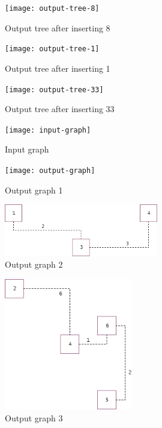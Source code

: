 \documentclass {article}
\begin{document}
\begin{figure}[H]
\centering
\texttt{[image: output-tree-8]}

\caption{Output tree after inserting 8}
\label{fig:output-tree-8}
\end{figure}

\begin{figure}[H]
\texttt{[image: output-tree-1]}

\caption{Output tree after inserting 1}
\label{fig:output-tree-1}
\end{figure}

\begin{figure}[H]
\texttt{[image: output-tree-33]}

\caption{Output tree after inserting 33}
\label{fig:output-tree-33}
\end{figure}

\begin{figure}[H]
\centering
\texttt{[image: input-graph]}

\caption{Input graph}
\label{fig:input-graph}
\end{figure}

\begin{figure}[H]
\centering
\texttt{[image: output-graph]}

\caption{Output graph 1}
\label{fig:output-graph}
\end{figure}

\begin{figure}[H]
\centering
\includegraphics[width=0.6\textwidth]{output-graph2}

\caption{Output graph 2}
\label{fig:output-graph2}
\end{figure}

\begin{figure}[H]
\centering
\includegraphics[width=0.5\textwidth]{output-graph3}

\caption{Output graph 3}
\label{fig:output-graph3}
\end{figure}
\end{document}
